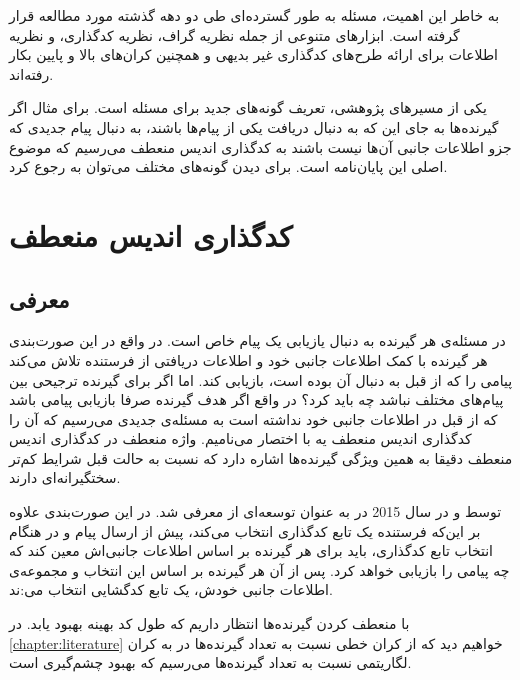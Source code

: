 به خاطر این اهمیت، مسئله \icod به طور گسترده‌ای طی دو دهه گذشته مورد مطالعه قرار گرفته است. ابزارهای متنوعی از جمله نظریه گراف، نظریه کدگذاری، و نظریه اطلاعات برای ارائه طرح‌های کدگذاری غیر بدیهی
\cite{25, 101, 22, 43, 114, 29, 8, 104, 81, 130, 7, 9, 149, 116, 80, 141, 146, 162}
و همچنین کران‌‌های بالا و پایین 
\cite{160, 22, 55, 28, 17, 141}
 بکار رفته‌اند.
 
 یکی از مسیرهای پژوهشی، تعریف گونه‌های جدید برای مسئله است. برای مثال اگر گیرنده‌ها به جای این که به دنبال دریافت یکی از پیام‌ها باشند، به دنبال پیام جدیدی که جزو اطلاعات جانبی آن‌ها نیست باشند به کدگذاری اندیس منعطف می‌رسیم که موضوع اصلی این پایان‌نامه است. برای دیدن گونه‌های مختلف می‌توان به
 \cite{pliablefirstpaper, verypliable, byrne2023preferential}
 رجوع کرد.
 \pagebreak
 \section{کدگذاری اندیس منعطف}
 
 \subsection{معرفی}
 در مسئله‌ی
 \icod
 هر گیرنده به دنبال یازیابی یک پیام خاص است. در واقع در این صورت‌بندی هر گیرنده با کمک اطلاعات جانبی خود و اطلاعات دریافتی از فرستنده تلاش می‌کند پیامی را که از قبل به دنبال آن بوده است، بازیابی کند. اما اگر برای گیرنده ترجیحی بین پیام‌های مختلف نباشد چه باید کرد؟ در واقع اگر هدف گیرنده صرفا بازیابی پیامی باشد که از قبل در اطلاعات جانبی خود نداشته است به مسئله‌ی جدیدی می‌رسیم که آن را کدگذاری اندیس منعطف یه با اختصار \picod می‌نامیم. واژه منعطف در کدگذاری اندیس منعطف دقیقا به همین ویژگی گیرنده‌ها اشاره دارد که نسبت به حالت قبل شرایط کم‌تر سختگیرانه‌ای دارند.
 
 \picod توسط 
 و 
  در سال 2015 در
 \cite{pliablefirstpaper}
 به عنوان توسعه‌ای از \icod معرفی شد. در این صورت‌بندی علاوه بر این‌که فرستنده یک تابع کدگذاری انتخاب می‌کند، پیش از ارسال پیام و در هنگام انتخاب تابع کدگذاری، باید برای هر گیرنده بر اساس اطلاعات جانبی‌اش معین کند که چه پیامی را بازيابی خواهد کرد. پس از آن هر گیرنده بر اساس این انتخاب و مجموعه‌ی اطلاعات جانبی خودش، یک تابع کدگشایی انتخاب می‌:ند.
 
 با منعطف کردن گیرنده‌ها انتظار داریم که طول کد بهینه بهبود یابد. در 
 \autoref{chapter:literature}
 خواهیم دید که از کران خطی نسبت به تعداد گیرنده‌ها در
 \icod
 به کران لگاریتمی نسبت به تعداد گیرنده‌ها می‌رسیم که بهبود چشم‌گیری است.
 
